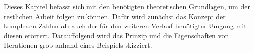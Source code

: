 
Dieses Kapitel befasst sich mit den benötigten theoretischen Grundlagen, um
der restlichen Arbeit folgen zu können.
Dafür wird zunächst das Konzept der komplexen Zahlen als auch der für den weiteren
Verlauf benötigter Umgang mit diesen erörtert.
Darauffolgend wird das Prinzip und die Eigenschaften von Iterationen grob
anhand eines Beispiels skizziert.


